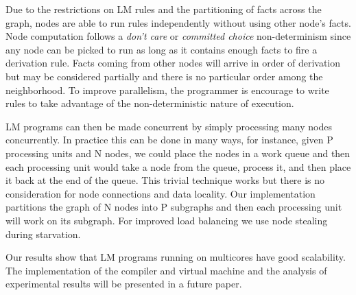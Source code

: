 Due to the restrictions on LM rules and the partitioning of facts across the graph, nodes are able to
run rules independently without using other node's facts. Node computation follows a \emph{don't care} or \emph{committed choice} non-determinism
since any node can be picked to run as long as it contains enough facts to fire a derivation rule.
Facts coming from other nodes will arrive in order of derivation but may be considered
partially and there is no particular order among the neighborhood. To improve parallelism, the programmer is encourage to write rules to take
advantage of the non-deterministic nature of execution.

LM programs can then be made concurrent by simply processing many nodes concurrently. In practice this can be done in many ways, for instance,
given P processing units and N nodes, we could place the nodes in a work queue and then each processing unit would take
a node from the queue, process it, and then place it back at the end of the queue. This trivial technique works but there is no consideration
for node connections and data locality. Our implementation partitions the graph of N nodes into P subgraphs and then each
processing unit will work on its subgraph.
For improved load balancing we use node stealing during starvation.

Our results show that LM programs running on multicores have good scalability.
The implementation of the compiler and virtual machine and
the analysis of experimental results will be presented in a future paper.
